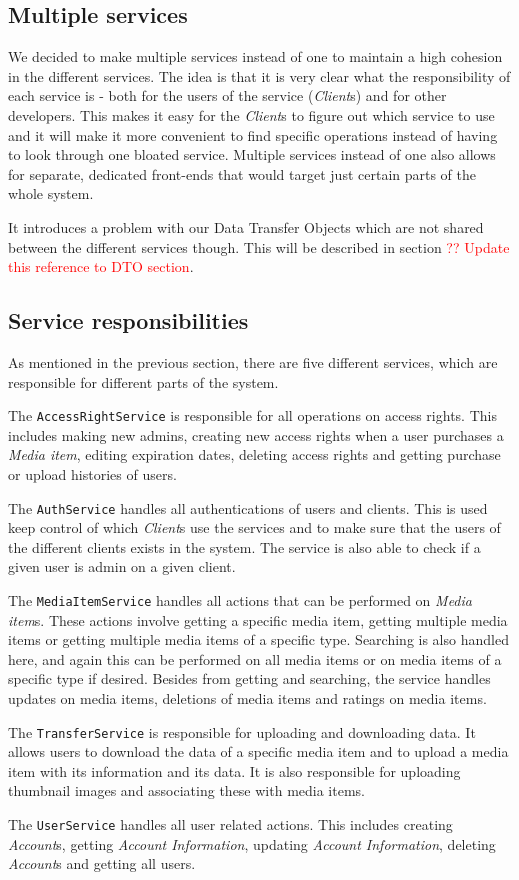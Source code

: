 \documentclass[../report.tex]{subfiles}
\begin{document}
\subsection{Multiple services}
We decided to make multiple services instead of one to maintain a high cohesion in the different services. The idea is that it is very clear what the responsibility of each service is - both for the users of the service (\textit{Client}s) and for other developers. This makes it easy for the \textit{Client}s to figure out which service to use and it will make it more convenient to find specific operations instead of having to look through one bloated service. Multiple services instead of one also allows for separate, dedicated front-ends that would target just certain parts of the whole system. 

It introduces a problem with our Data Transfer Objects which are not shared between the different services though. This will be described in section \textcolor{red}{?? Update this reference to DTO section}. 

\subsection{Service responsibilities}
As mentioned in the previous section, there are five different services, which are responsible for different parts of the system. 

The \texttt{AccessRightService} is responsible for all operations on access rights. This includes making new admins, creating new access rights when a user purchases a \textit{Media item}, editing expiration dates, deleting access rights and getting purchase or upload histories of users. 

The \texttt{AuthService} handles all authentications of users and clients. This is used keep control of which \textit{Client}s use the services and to make sure that the users of the different clients exists in the system. The service is also able to check if a given user is admin on a given client.

The \texttt{MediaItemService} handles all actions that can be performed on \textit{Media item}s. These actions involve getting a specific media item, getting multiple media items or getting multiple media items of a specific type. Searching is also handled here, and again this can be performed on all media items or on media items of a specific type if desired. Besides from getting and searching, the service handles updates on media items, deletions of media items and ratings on media items.

The \texttt{TransferService} is responsible for uploading and downloading data. It allows users to download the data of a specific media item and to upload a media item with its information and its data. It is also responsible for uploading thumbnail images and associating these with media items.

The \texttt{UserService} handles all user related actions. This includes creating \textit{Account}s, getting \textit{Account Information}, updating \textit{Account Information}, deleting \textit{Account}s and getting all users. 
\end{document}
